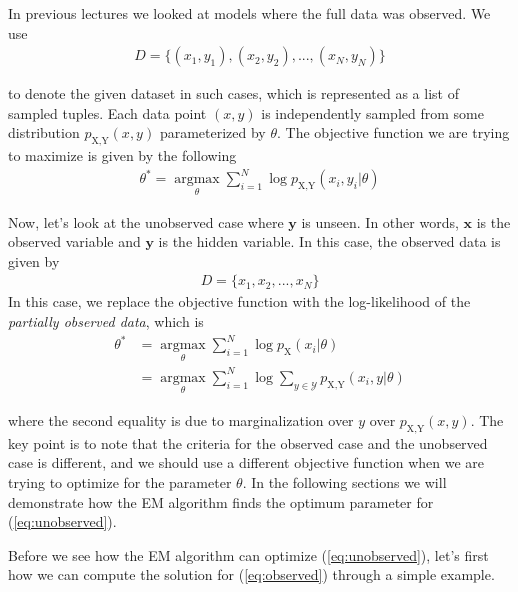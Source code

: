 \documentclass[justified, marginals=justified]{tufte-handout}
\theoremstyle{definition}
\begin{document}
In previous lectures we looked at models where the full data was observed. We use 
\begin{align*}
D = \{(x_1, y_1), (x_2, y_2), ..., (x_N, y_N)\}
\end{align*}

\noindent to denote the given dataset in such cases, which is represented as a list of sampled tuples. Each data point $(x, y)$ is independently sampled from some distribution $p_{\text{X,Y}}(x,y)$ parameterized by $\theta$. The objective function we are trying to maximize is given by the following
\begin{align}
\label{eq:observed}\theta^{*} = \underset{\theta}{\operatorname{argmax}}\sum_{i=1}^{N}\log{p_{\text{X,Y}}(x_i, y_i|\theta) }
\end{align}

Now, let's look at the unobserved case where $\textbf{y}$ is unseen. In other words, $\textbf{x}$ is the observed variable and $\textbf{y}$ is the hidden variable. In this case, the observed data is given by
\begin{align*}
D = \{x_1, x_2, ..., x_N\}
\end{align*}
In this case, we replace the objective function with the log-likelihood of the \textit{partially observed data}, which is
\begin{align}
\theta^{*} &= \underset{\theta}{\operatorname{argmax}}\sum_{i=1}^{N}\log{p_{\text{X}}(x_i|\theta) } \nonumber \\
\label{eq:unobserved}&= \underset{\theta}{\operatorname{argmax}}\sum_{i=1}^{N}\log\sum_{y\in \mathcal{Y}}p_{\text{X,Y}}(x_i, y|\theta)
\end{align} 

\noindent where the second equality is due to marginalization over $y$ over $p_{ \text{X,Y} }(x,y)$. The key point is to note that the criteria for the observed case and the unobserved case is different, and we should use a different objective function when we are trying to optimize for the parameter $\theta$. In the following sections we will demonstrate how the EM algorithm finds the optimum parameter for (\ref{eq:unobserved}).

Before we see how the EM algorithm can optimize (\ref{eq:unobserved}), let's first how we can compute the solution for (\ref{eq:observed}) through a simple example. 
\end{document}
